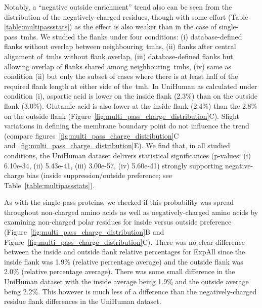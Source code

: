 Notably, a ``negative outside enrichment'' trend also can be seen from the distribution of the negatively\--charged residues, though with some effort (Table \ref{table:multipassstats}) as the effect is also weaker than in the case of single\--pass~\gls{tmh}s.
We studied the flanks under four conditions: (i) database-defined flanks without overlap between neighbouring~\gls{tmh}s, (ii) flanks after central alignment of~\gls{tmh}s without flank overlap, (iii) database-defined flanks but allowing overlap of flanks shared among neighbouring~\gls{tmh}s, (iv) same as condition (ii) but only the subset of cases where there is at least half of the required flank length at either side of the~\gls{tmh}.
In UniHuman as calculated under condition (i), aspartic acid is lower on the inside flank (2.3\%) than on the outside flank (3.0\%).
Glutamic acid is also lower at the inside flank (2.4\%) than the 2.8\% on the outside flank (Figure~\ref{fig:multi_pass_charge_distribution}C).
Slight variations in defining the membrane boundary point do not influence the trend (compare figures~\ref{fig:multi_pass_charge_distribution}C and~\ref{fig:multi_pass_charge_distribution}E).
We find that, in all studied conditions, the UniHuman dataset delivers statistical significances (p\--values: (i) 6.10e-34, (ii) 5.43e-41, (iii) 3.00e-57, (iv) 5.60e-41) strongly supporting negative\--charge bias (inside suppression/outside preference; see Table~\ref{table:multipassstats}).

As with the single\--pass proteins, we checked if this probability was spread throughout non\--charged amino acids as well as negatively\--charged amino acids by examining non-charged polar residues for inside versus outside preference (Figure~\ref{fig:multi_pass_charge_distribution}B and Figure~\ref{fig:multi_pass_charge_distribution}C).
There was no clear difference between the inside and outside flank relative percentages for ExpAll since the inside flank was 1.9\% (relative percentage average) and the outside flank was 2.0\% (relative percentage average).
There was some small difference in the UniHuman dataset with the inside average being 1.9\% and the outside average being 2.2\%.
This however is much less of a difference than the negatively\--charged residue flank differences in the UniHuman dataset.


